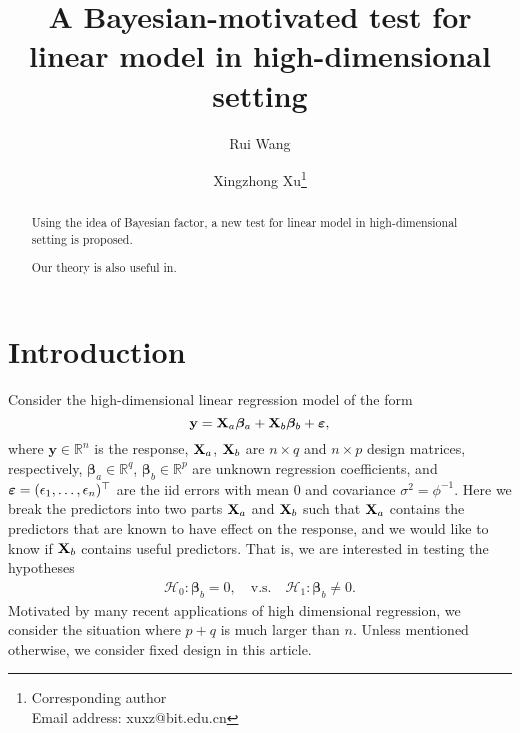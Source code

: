 \documentclass[11pt]{article}
\newcommand{\By}{\mathbf{y}}    \newcommand{\Bz}{\mathbf{z}}
\newcommand{\bfsym}[1]{\ensuremath{\boldsymbol{#1}}}
\def\bbeta{\bfsym \beta}
\theoremstyle{plain}
\theoremstyle{definition}
\theoremstyle{remark}
\begin{document}
\title{
A Bayesian-motivated test for linear model in high-dimensional setting
}



\author[1]{Rui Wang}
\author[1,2]{Xingzhong Xu\thanks{Corresponding author\\Email address: xuxz@bit.edu.cn}}

\maketitle
\begin{abstract}
    Using the idea of Bayesian factor, a new test for linear model in high-dimensional setting is proposed.

    Our theory is also useful in.
\end{abstract}
\section{Introduction} 
Consider the high-dimensional linear regression model of the form
\begin{equation}\label{label:linearModel}
    \By = 
    \BX_a \bbeta_a + \BX_b \bbeta_b + \bepsilon, %
\end{equation}
where $\By \in \mathbb R^n$ is the response, 
$\mathbf{X}_a$, $\mathbf{X}_b$ are $n\times q$ and $n\times p$ design matrices, respectively,  $\bbeta_a\in \mathbb R^q$, $\bbeta_b\in \mathbb R^p$ are unknown regression coefficients, and $\bepsilon=(\epsilon_1,\ldots,\epsilon_n)^\top$ are the iid errors with mean $0$ and covariance $\sigma^2=\phi^{-1}$.
Here we break the predictors into two parts $\mathbf{X}_a$ and $\mathbf{X}_b$ such that $\mathbf{X}_a$ contains the predictors that are known to have effect on the response,
and we would like to know if $\mathbf{X}_b$ contains useful predictors.
That is, we are interested in testing the hypotheses
\begin{align}\label{theHypothesis}
    \mathcal H_0:   \bbeta_b =0,\quad
    \text{v.s.} \quad
    \mathcal H_1:   \bbeta_b \neq 0.
\end{align}
Motivated by many recent applications of high dimensional regression, we consider the situation where $p+q$ is much larger than $n$.
Unless mentioned otherwise, we consider fixed design in this article.
\end{document}
